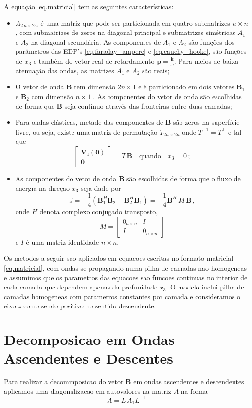 A equação \ref{eq.matricial} tem as seguintes caracter\'isticas:
\begin{itemize}
\item $A_{2\,n\times2\,n}$ \'e uma matriz que pode ser particionada em quatro submatrizes $n\times n$, com submatrizes de zeros na diagonal principal e submatrizes sim\'etricas $A_1$ e $A_2$ na diagonal secund\'aria. As componentes de $A_1$ e $A_2$ s\~ao fun\c{c}\~oes dos par\^ametros das EDP's \ref{eq.faraday_ampere} e \ref{eq.cauchy_hooke}, s\~ao fun\c{c}\~oes de $x_3$ e tamb\'em do vetor real de retardamento $\mathbf{p}=\frac{\mathbf{k}}{\omega}$. Para meios de baixa atenua\c{c}\~ao das ondas, as matrizes $A_1$ e $A_2$ s\~ao reais; 
\item O vetor de onda $\mathbf{B}$ tem dimens\~ao $2n\times1$ e \'e particionado em dois vetores $\mathbf{B}_1$ e $\mathbf{B}_2$ com dimens\~ao $n\times1$ . As componentes do vetor de onda s\~ao escolhidas de forma que $\mathbf{B}$ seja cont\'inuo atrav\'es das fronteiras entre duas camadas;
\item  Para ondas el\'asticas, metade das componentes de $\mathbf{B}$ s\~ao zeros na superf\'icie livre, ou seja, existe uma matriz de permuta\c{c}\~ao $T_{2n\times2n}$ onde $T^{-1}=T^\top$ e tal que
\begin{equation}
\begin{bmatrix}
\mathbf{V}_1(\mathbf{0})\\
\mathbf{0}
\end{bmatrix}
=T\,\mathbf{B}\quad\text{quando}\quad x_3 = 0\,;
\end{equation}
\item As componentes do vetor de onda $\mathbf{B}$ s\~ao escolhidas de forma que o fluxo de energia na dire\c{c}\~ao $x_3$ seja dado por
\begin{equation}
J=-\frac{1}{4}(\mathbf{B}_1^H\mathbf{B}_2+\mathbf{B}_2^H\mathbf{B}_1)=-\frac{1}{4}\mathbf{B}^H\,M\, \mathbf{B}\,,
\end{equation}
onde $H$ denota complexo conjugado transposto,
\begin{equation}
M=
\begin{bmatrix}
0_{n\times n}&I\\
I&0_{n\times n}
\end{bmatrix}
\end{equation}
e $I$ \'e uma matriz identidade $n\times n$.
\end{itemize}

Os metodos a seguir sao aplicados em equacoes escritas no formato matricial \ref{eq.matricial}, com ondas se propagando numa pilha de camadas nao homogeneas e assumimos que os parametros das equacoes sao funcoes continuas no interior de cada camada que dependem apenas da profunidade $x_3$. O modelo inclui pilha de camadas homogeneas com parametros constantes por camada e consideramos o eixo $z$ como sendo positivo no sentido descendente.   

\section{Decomposicao em Ondas Ascendentes e Descentes}

Para realizar a decommposicao do vetor $\mathbf{B}$ em ondas ascendentes e descendentes aplicamos uma diagonalizacao em autovalores na matriz $A$ na forma
\begin{equation}
A=L\,A_1L^{-1}
\end{equation}



